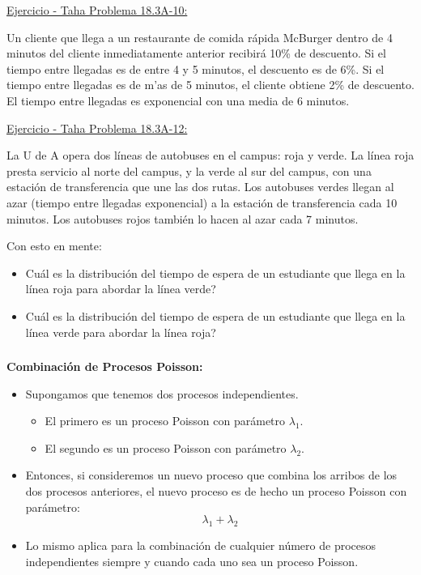 \documentclass[ 10pt, xcolor = dvipsnames]{beamer}
\begin{document}
\begin{frame}[allowframebreaks]
\framebreak

\underline{Ejercicio - Taha Problema 18.3A-10:}

Un cliente que llega a un restaurante de comida r\'apida McBurger dentro de 4 minutos del cliente inmediatamente anterior recibir\'a 10\% de descuento. \linebreak Si el tiempo entre llegadas es de entre 4 y 5 minutos, el descuento es de 6\%. \linebreak Si el tiempo entre llegadas es de m'as de 5 minutos, el cliente obtiene 2\% de descuento. El tiempo entre llegadas es exponencial con una media de 6 minutos. 

\framebreak

\underline{Ejercicio - Taha Problema 18.3A-12:}

La U de A opera dos l\'ineas de autobuses en el campus: roja y verde. La l\'inea roja presta servicio al norte del campus, y la verde al sur del campus, con una estaci\'on de transferencia que une las dos rutas. Los autobuses verdes llegan al azar (tiempo entre llegadas exponencial) a la estaci\'on de transferencia cada 10 minutos. Los autobuses rojos tambi\'en lo hacen al azar cada 7 minutos. 

Con esto en mente: 
\begin{itemize}
\item Cu\'al es la distribuci\'on del tiempo de espera de un estudiante que llega en la l\'inea roja para abordar la l\'inea verde? 
\item Cu\'al es la distribuci\'on del tiempo de espera de un estudiante que llega en la l\'inea verde para abordar la l\'inea roja? 
\end{itemize}

\end{frame}

\begin{frame}[allowframebreaks]
\frametitle{\insertsection}

\textbf{Combinaci\'on de Procesos Poisson:}
\begin{itemize}
\item Supongamos que tenemos dos procesos independientes. 
\begin{itemize}
\item El primero es un proceso Poisson con par\'ametro $\lambda_1$.
\item El segundo es un proceso Poisson con par\'ametro $\lambda_2$.
\end{itemize}
\item Entonces, si consideremos un nuevo proceso que combina los arribos de \linebreak los dos procesos anteriores, el nuevo proceso es de hecho un \linebreak proceso Poisson con par\'ametro:
\[
\lambda_1 + \lambda_2
\]
\item Lo mismo aplica para la combinaci\'on de cualquier n\'umero de procesos independientes siempre y cuando cada uno sea un proceso Poisson. 
\end{itemize}

\end{frame}
\end{document}
